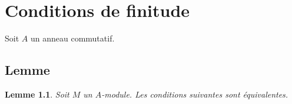 \documentclass[a4paper, oneside, 12pt]{book}
\theoremstyle{theoremeStyle} %
\newtheorem{lemme}[theoreme]{Lemme}
\theoremstyle{definition} %
\begin{document}
\chapter{Conditions de finitude}

 Soit $A$ un anneau commutatif. \\

\section{Lemme}\label{Noetherien}

\begin{lemme}Soit $M$ un $A$-module. Les conditions suivantes sont équivalentes.
\begin{enumerate}[leftmargin=* ,parsep=0cm,itemsep=0cm,topsep=0cm]


\end{enumerate}
\end{lemme}
\end{document}
